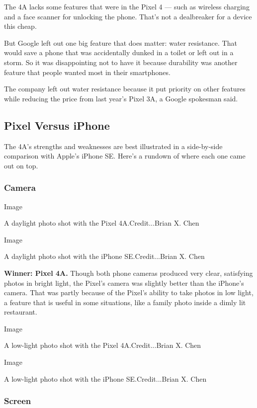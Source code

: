The 4A lacks some features that were in the Pixel 4 --- such as wireless
charging and a face scanner for unlocking the phone. That's not a
dealbreaker for a device this cheap.

But Google left out one big feature that does matter: water resistance.
That would save a phone that was accidentally dunked in a toilet or left
out in a storm. So it was disappointing not to have it because
durability was another feature that people wanted most in their
smartphones.

The company left out water resistance because it put priority on other
features while reducing the price from last year's Pixel 3A, a Google
spokesman said.

\hypertarget{pixel-versus-iphone}{%
\subsection{Pixel Versus iPhone}\label{pixel-versus-iphone}}

The 4A's strengths and weaknesses are best illustrated in a side-by-side
comparison with Apple's iPhone SE. Here's a rundown of where each one
came out on top.

\hypertarget{camera}{%
\subsubsection{\texorpdfstring{\textbf{Camera}}{Camera}}\label{camera}}

Image

A daylight photo shot with the Pixel 4A.Credit...Brian X. Chen

Image

A daylight photo shot with the iPhone SE.Credit...Brian X. Chen

\textbf{Winner: Pixel 4A.} Though both phone cameras produced very
clear, satisfying photos in bright light, the Pixel's camera was
slightly better than the iPhone's camera. That was partly because of the
Pixel's ability to take photos in low light, a feature that is useful in
some situations, like a family photo inside a dimly lit restaurant.

Image

A low-light photo shot with the Pixel 4A.Credit...Brian X. Chen

Image

A low-light photo shot with the iPhone SE.Credit...Brian X. Chen

\hypertarget{screen}{%
\subsubsection{Screen}\label{screen}}


